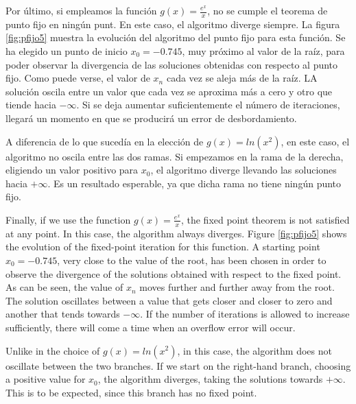 \begin{paracol}{2}
Por último, si empleamos la función $g(x)=\frac{e^x}{x}$, no se cumple el teorema de punto fijo en ningún punt. En este caso, el algoritmo diverge siempre.  La figura \ref{fig:pfijo5} muestra la evolución del algoritmo del punto fijo para esta función. Se ha elegido un punto de inicio $x_0=-0.745$, muy próximo al valor de la raíz, para poder observar la divergencia de las soluciones obtenidas con respecto al punto fijo. Como puede verse, el valor de $x_n$ cada vez se aleja más de la raíz. LA solución oscila entre un valor que cada vez se aproxima más a cero y otro que tiende hacia $-\infty$. Si se deja aumentar suficientemente el número de iteraciones, llegará un momento en que se producirá un error de desbordamiento. 

A diferencia de lo que sucedía en la elección de $g(x)=ln(x^2)$, en este caso, el algoritmo no oscila entre las dos ramas. Si empezamos en la rama de la derecha, eligiendo un valor positivo para $x_0$, el algoritmo diverge llevando las soluciones hacia $+\infty$. Es un resultado esperable, ya que dicha rama no tiene ningún punto fijo.

\switchcolumn

Finally, if we use the function $g(x)=\frac{e^x}{x}$, the fixed point theorem is not satisfied at any point. In this case, the algorithm always diverges. Figure \ref{fig:pfijo5} shows the evolution of the fixed-point iteration for this function. A starting point $x_0=-0.745$, very close to the value of the root, has been chosen in order to observe the divergence of the solutions obtained with respect to the fixed point. As can be seen, the value of $x_n$ moves further and further away from the root. The solution oscillates between a value that gets closer and closer to zero and another that tends towards $-\infty$. If the number of iterations is allowed to increase sufficiently, there will come a time when an overflow error will occur. 

Unlike in the choice of $g(x)=ln(x^2)$, in this case, the algorithm does not oscillate between the two branches. If we start on the right-hand branch, choosing a positive value for $x_0$, the algorithm diverges, taking the solutions towards $+\infty$. This is to be expected, since this branch has no fixed point.

\end{paracol}


